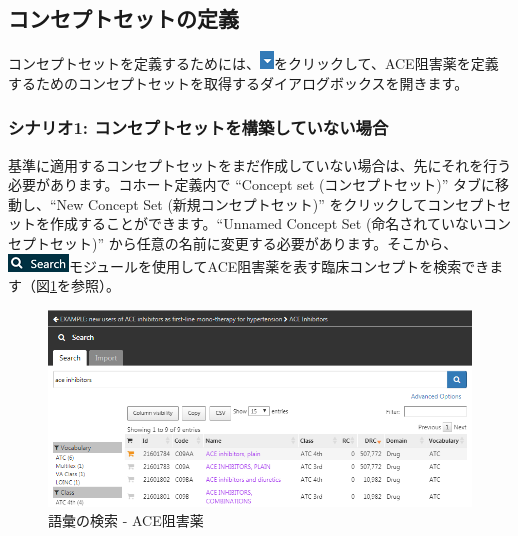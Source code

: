 \documentclass[
  11pt]{book}
\theoremstyle{definition}
\theoremstyle{definition}
\theoremstyle{definition}
\theoremstyle{definition}
\theoremstyle{remark}
\begin{document}
\subsection{コンセプトセットの定義}\label{ux30b3ux30f3ux30bbux30d7ux30c8ux30bbux30c3ux30c8ux306eux5b9aux7fa9}

コンセプトセットを定義するためには、\includegraphics{images/Cohorts/downarrow.png}をクリックして、ACE阻害薬を定義するためのコンセプトセットを取得するダイアログボックスを開きます。

\subsubsection*{シナリオ1: コンセプトセットを構築していない場合}\label{ux30b7ux30caux30eaux30aa1-ux30b3ux30f3ux30bbux30d7ux30c8ux30bbux30c3ux30c8ux3092ux69cbux7bc9ux3057ux3066ux3044ux306aux3044ux5834ux5408}

基準に適用するコンセプトセットをまだ作成していない場合は、先にそれを行う必要があります。コホート定義内で ``Concept set (コンセプトセット)'' タブに移動し、``New Concept Set (新規コンセプトセット)'' をクリックしてコンセプトセットを作成することができます。``Unnamed Concept Set (命名されていないコンセプトセット)'' から任意の名前に変更する必要があります。そこから、\includegraphics{images/Cohorts/search-2.png}モジュールを使用してACE阻害薬を表す臨床コンセプトを検索できます（図\ref{fig:aceinhibitors}を参照）。

\begin{figure}

{\centering \includegraphics[width=1\linewidth]{images/Cohorts/aceinhibitors} 

}

\caption{語彙の検索 - ACE阻害薬}\label{fig:aceinhibitors}
\end{figure}
\end{document}
